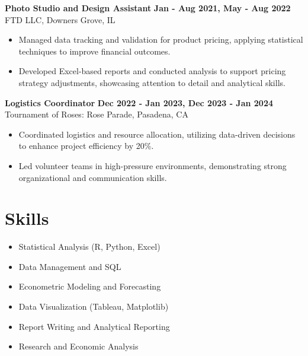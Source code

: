 \documentclass[10pt]{article}
\begin{document}
\textbf{Photo Studio and Design Assistant} \hfill \textbf{Jan - Aug 2021, May - Aug 2022} \\
FTD LLC, Downers Grove, IL \\
\begin{itemize}[noitemsep,nosep]
    \item Managed data tracking and validation for product pricing, applying statistical techniques to improve financial outcomes.
    \item Developed Excel-based reports and conducted analysis to support pricing strategy adjustments, showcasing attention to detail and analytical skills.
\end{itemize}

\vspace{10pt}
\noindent\textbf{Logistics Coordinator} \hfill \textbf{Dec 2022 - Jan 2023, Dec 2023 - Jan 2024} \\
Tournament of Roses: Rose Parade, Pasadena, CA \\
\begin{itemize}[noitemsep,nosep]
    \item Coordinated logistics and resource allocation, utilizing data-driven decisions to enhance project efficiency by 20\%.
    \item Led volunteer teams in high-pressure environments, demonstrating strong organizational and communication skills.
\end{itemize}

\vspace{-10pt}
\section*{Skills}
\vspace{0pt}
\begin{multicols}{2}
\begin{itemize}[noitemsep,nosep]
    \item Statistical Analysis (R, Python, Excel)
    \item Data Management and SQL
    \item Econometric Modeling and Forecasting
    \item Data Visualization (Tableau, Matplotlib)
    \item Report Writing and Analytical Reporting
    \item Research and Economic Analysis
\end{itemize}
\end{multicols}
\end{document}
